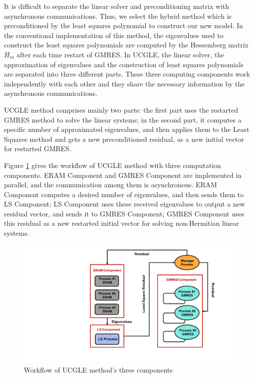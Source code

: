 It is difficult to separate the linear solver and preconditioning matrix with asynchronous communications. Thus, we select the hybrid method which is preconditioned by the least squares polynomial to construct our new model. In the conventional implementation of this method, the eigenvalues used to construct the least squares polynomials are computed by the Hessemberg matrix $H_m$ after each time restart of GMRES. In UCGLE, the linear solver, the approximation of eigenvalues and the construction of least squares polynomials are separated into three different parts. These three computing components work independently with each other and they share the necessary information by the asynchronous communications.

UCGLE method comprises mainly two parts: the first part uses the restarted GMRES method to solve the linear systems; in the second part, it computes a specific number of approximated eigenvalues, and then applies them to the Least Squares method and gets a new preconditioned residual, as a new initial vector for restarted GMRES. 

Figure \ref{fig:worflow} gives the workflow of UCGLE method with three computation components. ERAM Component and GMRES Component are implemented in parallel, and the communication among them is asynchronous. ERAM Component computes a desired number of eigenvalues, and then sends them to LS Component; LS Component uses these received eigenvalues to output a new residual vector, and sends it to GMRES Component; GMRES Component uses this residual as a new restarted initial vector for solving non-Hermitian linear systems.

\begin{figure}[htbp]
	\centering
	\includegraphics[width=5.2in]{fig/workflow.pdf}
	\caption{Workflow of UCGLE method's three components}
	\label{fig:worflow}
\end{figure}


